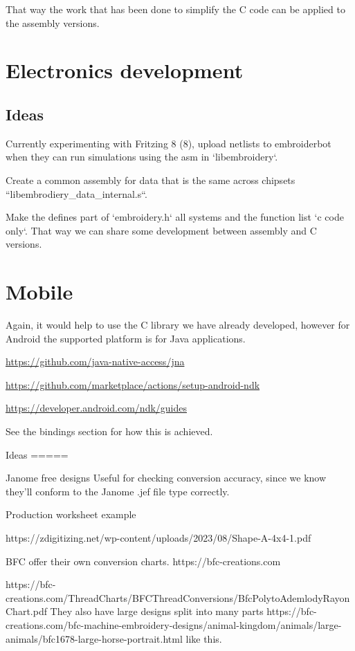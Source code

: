 \documentclass[a4paper]{report}
\begin{document}
That way the work that has been done to simplify the C code can be applied
to the assembly versions.

\chapter{Electronics development}

\section{Ideas}

Currently experimenting with Fritzing 8 (8), upload netlists to embroiderbot when
they can run simulations using the asm in `libembroidery`.

Create a common assembly for data that is the same across chipsets
``libembrodiery\_data\_internal.s``.

Make the defines part of `embroidery.h` all systems and the function list
`c code only`. That way we can share some development between assembly and C versions.

\chapter{Mobile}

Again, it would help to use the C library we have already developed,
however for Android the supported platform is for Java applications.

\url{https://github.com/java-native-access/jna}

\url{https://github.com/marketplace/actions/setup-android-ndk}

\url{https://developer.android.com/ndk/guides}

See the bindings section for how this is achieved.

Ideas
=====

Janome free designs %
Useful for checking conversion accuracy, since we know they'll conform to the
Janome .jef file type correctly.

Production worksheet example

https://zdigitizing.net/wp-content/uploads/2023/08/Shape-A-4x4-1.pdf

BFC offer their own conversion charts.
https://bfc-creations.com

https://bfc-creations.com/ThreadCharts/BFCThreadConversions/BfcPolytoAdemlodyRayonChart.pdf
They also have large designs split into many parts
https://bfc-creations.com/bfc-machine-embroidery-designs/animal-kingdom/animals/large-animals/bfc1678-large-horse-portrait.html
like this.
\end{document}

